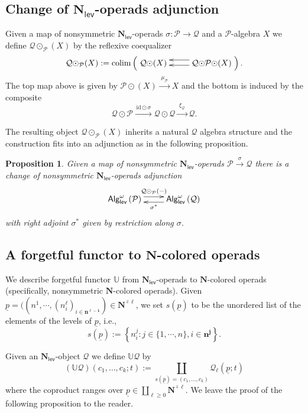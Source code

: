 \documentclass[11pt]{amsart}
\newtheorem{proposition}[subsection]{Proposition}
\theoremstyle{definition}
\theoremstyle{remark}
\newcommand{\AlgN}[1]{\mathsf{Alg}^{\omega}_{\mathsf{lev}}\left(\mathcal{#1}\right)}
\newcommand{\colim}{\operatorname{colim}}
\newcommand{\id}{\mathrm{id}}
\newcommand{\Cal}[1]{\mathcal{#1}}
\newcommand{\Ncirc}[1]{\mathbf{N}^{\hat{\circ}#1}}
\newcommand{\circdot}{{\odot}}
\newcommand{\Nl}{\mathbf{N}_{\mathsf{lev}}}
\begin{document}
\subsection{Change of $\Nl$-operads adjunction}
Given a map of nonsymmetric $\Nl$-operads $\sigma\colon \Cal{P}\to \Cal{Q}$ and a $\Cal{P}$-algebra $X$ we define $\Cal{Q} \circdot_{\Cal{P}}(X)$ by the reflexive coequalizer \begin{equation*}
\label{circ-dot-over}
    \Cal{Q}\circdot_{\Cal{P}}(X):= \colim \left( \xymatrix{
    \Cal{Q}\circdot  (X) & \ar@<-1ex>[l] \ar@<.5ex>[l]  \Cal{Q}\circdot\Cal{P}\circdot (X) }\right).
\end{equation*}
The top map above is given by $\Cal{P}\circdot (X)\xrightarrow{\;\mu_{\Cal{P}}\;} X$ and the bottom is induced by the composite \[\Cal{Q}\circdot \Cal{P}\xrightarrow{\,\id \circdot \sigma\,} \Cal{Q}\circdot \Cal{Q}\xrightarrow{\;\xi_{\Cal{Q}}\;} \Cal{Q}.\] 

The resulting object $\Cal{Q}\circdot_{\Cal{P}}(X)$ inherits a natural $\Cal{Q}$ algebra structure and the construction fits into an adjunction as in the following proposition.

\begin{proposition} 
Given a map of nonsymmetric $\Nl$-operads $\mathcal{P}\xrightarrow{\; \sigma \;}\mathcal{Q}$ there is a change of nonsymmetric $\Nl$-operads adjunction \begin{equation*} \xymatrix{
    \AlgN{P} \ar@<.75 ex>[r] ^{\Cal{Q}\circdot_{\Cal{P}}(-)} &
    \AlgN{Q} \ar@<.75ex>[l]^{\sigma^*} }
\end{equation*}
with right adjoint $\sigma^*$ given by restriction along $\sigma$. 
\end{proposition}

\subsection{A forgetful functor to $\mathbf{N}$-colored operads} \label{N_l-is-N}  We describe forgetful functor $\mathbb{U}$ from $\Nl$-operads to $\mathbf{N}$-colored operads (specifically, nonsymmetric $\mathbf{N}$-colored operads). Given $\underline{p}=((n^1,\cdots, (n^{\ell}_i)_{i\in \mathbf{n^{\ell-1}}} )\in\Ncirc{\ell}$, we set $s(\underline{p})$ to be the unordered list of the elements of the levels of $\underline{p}$, i.e., \[s(\underline{p}):=\left\{n^j_i: j\in\{1,\cdots,n\}, i\in \mathbf{n^j} \right\}. \] 

Given an $\Nl$-object $\mathcal{Q}$ we define $\mathbb{U}\Cal{Q}$ by \begin{equation} 
    (\mathbb{U}\mathcal{Q})(c_1,\dots,c_k;t):=\coprod_{s(\underline{p})=(c_1,\dots,c_k)} \mathcal{Q}_{\ell}(\underline{p};t)
\end{equation}
where the coproduct ranges over $\underline{p}\in \coprod_{\ell \geq 0} \Ncirc{\ell}$. We leave the proof of the following proposition to the reader.
\end{document}
